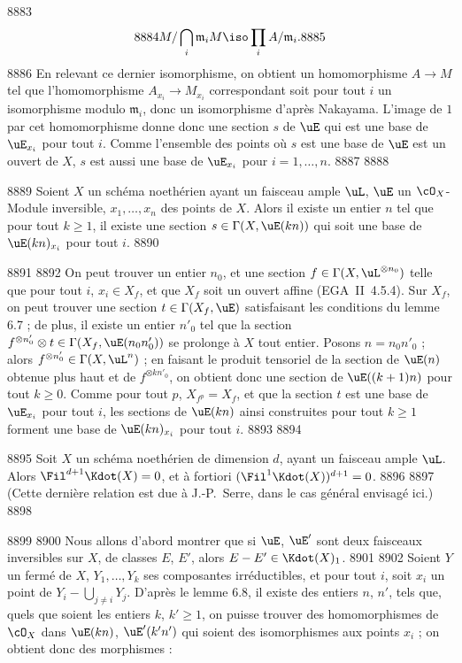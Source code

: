   8883	\[
  8884	M/\bigcap_i \mathfrak{m}_i M \iso \prod_i A/\mathfrak{m}_i.
  8885	\]
  8886	En relevant ce dernier isomorphisme, on obtient un homomorphisme $A \to M$ tel que l'homomorphisme $A_{x_i} \to M_{x_i}$ correspondant soit pour tout $i$ un isomorphisme modulo $\mathfrak{m}_i$, donc un isomorphisme d'apr\`es Nakayama. L'image de $1$ par cet homomorphisme donne donc une section $s$ de $\uE$ qui est une base de $\uE_{x_i}$ pour tout $i$. Comme l'ensemble des points o\`u $s$ est une base de $\uE$ est un ouvert de $X$, $s$ est aussi une base de $\uE_{x_i}$ pour $i = 1,\dots,n$.
  8887	
  8888	\begin{lemme}[6.8]
  8889	Soient $X$ un sch\'ema noeth\'erien ayant un faisceau ample $\uL$, $\uE$ un $\cO_X$-Module inversible, $x_1,\dots,x_n$ des points de $X$. Alors il existe un entier $n$ tel que pour tout $k \geq 1$, il existe une section $s \in \Gamma(X,\uE(kn))$ qui soit une base de $\uE(kn)_{x_i}$ pour tout $i$.
  8890	\end{lemme}
  8891	
  8892	On peut trouver un entier $n_0$, et une section $f \in \Gamma(X,\uL^{\otimes n_0})$ telle que pour tout $i$, $x_i \in X_f$, et que $X_f$ soit un ouvert affine (EGA~II~4.5.4). Sur $X_f$, on peut trouver une section $t \in \Gamma(X_f,\uE)$ satisfaisant les conditions du lemme 6.7 ; de plus, il existe un entier $n'_0$ tel que la section $f^{\otimes n'_0} \otimes t \in \Gamma(X_f,\uE(n_0 n'_0))$ se prolonge \`a $X$ tout entier. Posons $n = n_0 n'_0$ ; alors $f^{\otimes n'_0} \in \Gamma(X,\uL^n)$ ; en faisant le produit tensoriel de la section de $\uE(n)$ obtenue plus haut et de $f^{\otimes kn'_0}$, on obtient donc une section de $\uE((k+1)n)$ pour tout $k \geq 0$. Comme pour tout $p$, $X_{f^p} = X_f$, et que la section $t$ est une base de $\uE_{x_i}$ pour tout $i$, les sections de $\uE(kn)$ ainsi construites pour tout $k \geq 1$ forment une base de $\uE(kn)_{x_i}$ pour tout $i$.
  8893	
  8894	\begin{theoreme}[6.9]
  8895	Soit $X$ un sch\'ema noeth\'erien de dimension $d$, ayant un faisceau ample $\uL$. Alors $\Fil^{d+1} \Kdot(X) = 0$, et \`a fortiori $(\Fil^1 \Kdot(X))^{d+1} = 0$.
  8896	
  8897	\textup{(}Cette derni\`ere relation est due \`a J.-P.~Serre, dans le cas g\'en\'eral envisag\'e ici.\textup{)}
  8898	\end{theoreme}
  8899	
  8900	Nous allons d'abord montrer que si $\uE$, $\uE'$ sont deux faisceaux inversibles sur $X$, de classes $E$, $E'$, alors $E - E' \in \Kdot(X)_1$.
  8901	
  8902	Soient $Y$ un ferm\'e de $X$, $Y_1,\dots,Y_k$ ses composantes irr\'eductibles, et pour tout $i$, soit $x_i$ un point de $Y_i - \bigcup_{j \neq i} Y_j$. D'apr\`es le lemme 6.8, il existe des entiers $n$, $n'$, tels que, quels que soient les entiers $k$, $k' \geq 1$, on puisse trouver des homomorphismes de $\cO_X$ dans $\uE(kn)$, $\uE'(k'n')$ qui soient des isomorphismes aux points $x_i$ ; on obtient donc des morphismes :
